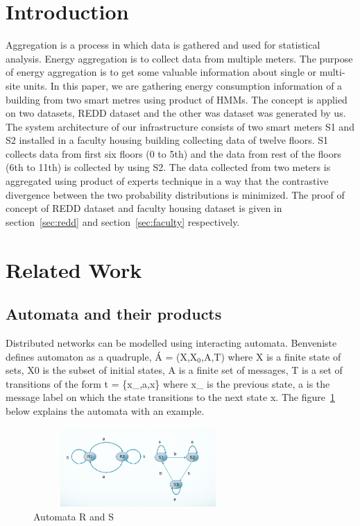\documentclass[10pt, conference, compsocconf]{IEEEtran}
\begin{document}
\section{Introduction}
\label{sec:intro}
Aggregation is a process in which data is gathered and used for statistical analysis. Energy aggregation is to collect data from multiple meters. The purpose of energy aggregation is to get some valuable information about single or multi-site units. In this paper, we are gathering energy consumption information of a building from two smart metres using product of HMMs. The concept is applied on two datasets, REDD dataset and the other was dataset was generated by us.  The system architecture of our infrastructure consists of two smart meters S1 and S2 installed in a faculty housing building collecting data of  twelve floors. S1 collects data from first six floors (0 to 5th) and the data from rest of the floors (6th to 11th) is collected by using S2. The data collected from two meters is aggregated using product of experts technique in a way that the contrastive divergence between the two probability distributions is minimized. The proof of concept of REDD dataset and faculty housing dataset is given in section~\ref{sec:redd} and section~\ref{sec:faculty} respectively.

\section{Related Work}
\subsection{Automata and their products}
\label{sec:related}

Distributed networks can be modelled using interacting automata. Benveniste defines automaton as a quadruple, \'{A} = (X,X$_{0}$,A,T) where X is a finite state of sets, X0 is the subset of initial states, A is a finite set of messages, T is a set of transitions of the form t = \{x\_,a,x\} where x\_ is the previous state, a is the message label on which the state transitions to the next state x. The figure~\ref{fig:ex} below explains the automata with an example.\\

\begin{figure}[t]
\centering
\includegraphics[width=8cm,height=3cm]{automata.png}
\caption{Automata R and S}
\label{fig:ex}
\end{figure}
\end{document}
